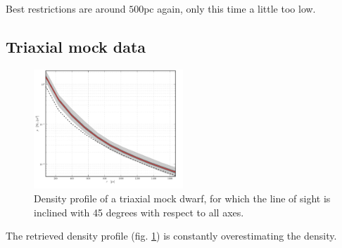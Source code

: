 Best restrictions are around $500$pc again, only this time a little
too low.





\subsection{Triaxial mock data}

\begin{figure}
\begin{center}
\hspace{-7mm}
\includegraphics[width=0.5\textwidth]{fig/20130718123300_cprior_nulog_denslog_mslope_rprior_profdens.pdf}
\caption{Density profile of a triaxial mock dwarf, for which the line of sight is inclined with 45 degrees with respect to all axes.}
\label{fig:triax}
\end{center}
\end{figure}

The retrieved density profile (fig. \ref{fig:triax}) is constantly overestimating the density.


